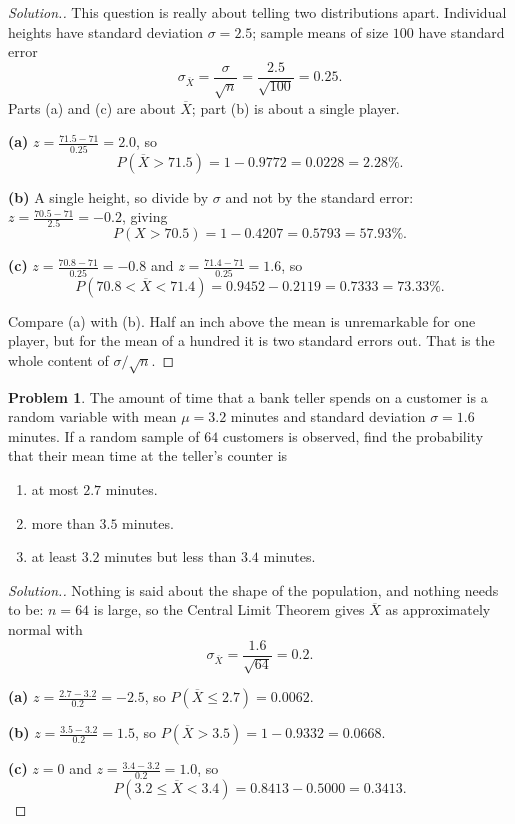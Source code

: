 \documentclass[11pt,a4paper]{article}
\theoremstyle{definition}
\newtheorem{problemx}{Problem}[section]
\newenvironment{problem}{\begin{problemx}}{\end{problemx}}
\newenvironment{solution}
  {\renewcommand{\qedsymbol}{}\begin{proof}[\textit{Solution}.]}
  {\end{proof}}
\begin{document}
\begin{solution}
This question is really about telling two distributions apart. Individual heights have
standard deviation $\sigma=2.5$; sample means of size $100$ have standard error
\[\sigma_{\overline{X}}=\frac{\sigma}{\sqrt{n}}=\frac{2.5}{\sqrt{100}}=0.25.\]
Parts (a) and (c) are about $\overline{X}$; part (b) is about a single player.

\textbf{(a)} $z=\frac{71.5-71}{0.25}=2.0$, so
\[P(\overline{X}>71.5)=1-0.9772=0.0228=2.28\%.\]

\textbf{(b)} A single height, so divide by $\sigma$ and not by the standard error:
$z=\frac{70.5-71}{2.5}=-0.2$, giving
\[P(X>70.5)=1-0.4207=0.5793=57.93\%.\]

\textbf{(c)} $z=\frac{70.8-71}{0.25}=-0.8$ and $z=\frac{71.4-71}{0.25}=1.6$, so
\[P(70.8<\overline{X}<71.4)=0.9452-0.2119=0.7333=73.33\%.\]

Compare (a) with (b). Half an inch above the mean is unremarkable for one player, but for
the mean of a hundred it is two standard errors out. That is the whole content of
$\sigma/\sqrt{n}$.
\end{solution}

\begin{problem}
The amount of time that a bank teller spends on a customer is a random variable with mean
$\mu=3.2$ minutes and standard deviation $\sigma=1.6$ minutes. If a random sample of $64$
customers is observed, find the probability that their mean time at the teller's counter is
\begin{enumerate}
\item[(a).] at most $2.7$ minutes.
\item[(b).] more than $3.5$ minutes.
\item[(c).] at least $3.2$ minutes but less than $3.4$ minutes.
\end{enumerate}
\end{problem}

\begin{solution}
Nothing is said about the shape of the population, and nothing needs to be: $n=64$ is large,
so the Central Limit Theorem gives $\overline{X}$ as approximately normal with
\[\sigma_{\overline{X}}=\frac{1.6}{\sqrt{64}}=0.2.\]

\textbf{(a)} $z=\frac{2.7-3.2}{0.2}=-2.5$, so $P(\overline{X}\leq 2.7)=0.0062$.

\textbf{(b)} $z=\frac{3.5-3.2}{0.2}=1.5$, so $P(\overline{X}>3.5)=1-0.9332=0.0668$.

\textbf{(c)} $z=0$ and $z=\frac{3.4-3.2}{0.2}=1.0$, so
\[P(3.2\leq \overline{X}<3.4)=0.8413-0.5000=0.3413.\]
\end{solution}
\end{document}
